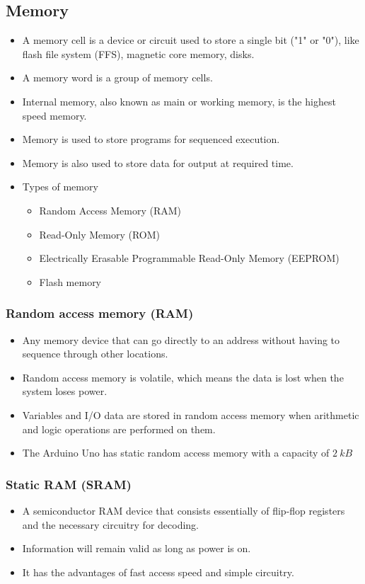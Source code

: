 \documentclass[11pt]{article}
\begin{document}
\subsection{Memory}
\label{sec:orgd832dc6}
\begin{itemize}
\item A memory cell is a device or circuit used to store a single bit ("1" or "0"), like flash file system (FFS), magnetic core memory, disks.
\item A memory word is a group of memory cells.
\item Internal memory, also known as main or working memory, is the highest speed memory.
\item Memory is used to store programs for sequenced execution.
\item Memory is also used to store data for output at required time.
\item Types of memory
\begin{itemize}
\item Random Access Memory (RAM)
\item Read-Only Memory (ROM)
\item Electrically Erasable Programmable Read-Only Memory (EEPROM)
\item Flash memory
\end{itemize}
\end{itemize}

\subsubsection{Random access memory (RAM)}
\label{sec:orgf46bf3f}
\begin{itemize}
\item Any memory device that can go directly to an address without having to sequence through other locations.
\item Random access memory is volatile, which means the data is lost when the system loses power.
\item Variables and I/O data are stored in random access memory when arithmetic and logic operations are performed on them.
\item The Arduino Uno has static random access memory with a capacity of \(\qty{2}{kB}\)
\end{itemize}

\subsubsection{Static RAM (SRAM)}
\label{sec:orgf7e704c}
\begin{itemize}
\item A semiconductor RAM device that consists essentially of flip-flop registers and the necessary circuitry for decoding.
\item Information will remain valid as long as power is on.
\item It has the advantages of fast access speed and simple circuitry.
\end{itemize}
\end{document}

